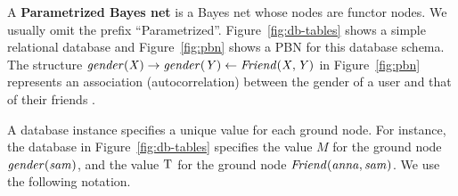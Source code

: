 \documentclass{article}
\begin{document}

A \textbf{Parametrized Bayes net} is a Bayes net whose nodes are functor nodes.  
We usually omit the prefix ``Parametrized''. 
Figure~\ref{fig:db-tables} shows a simple relational database 
and Figure~\ref{fig:pbn} shows a PBN for this database schema.
The structure $\it{gender}(X) \rightarrow \it{gender}(Y) \leftarrow \it{Friend}(X,Y)$ in Figure~\ref{fig:pbn} represents an association (autocorrelation) between the gender of a user 
and that of their friends  \cite{Schulte2012a}. 

A database instance specifies a unique value for each ground node.
For instance, the database in Figure~\ref{fig:db-tables} specifies the value $M$ for the ground node $\it{gender}(sam)$, 
and the value $\mathrm{T}$ for the ground node $\it{Friend}(anna,sam)$. We use the following notation. 
\end{document}
